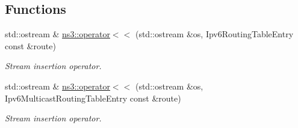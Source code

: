 \subsection*{Functions}
\begin{DoxyCompactItemize}
\item 
std\+::ostream \& \hyperlink{namespacens3_a05b3b1fa4697bd3d0e38436243095888}{ns3\+::operator$<$$<$} (std\+::ostream \&os, Ipv6\+Routing\+Table\+Entry const \&route)
\begin{DoxyCompactList}\small\item\em Stream insertion operator. \end{DoxyCompactList}\item 
std\+::ostream \& \hyperlink{namespacens3_a30841a81c3cf6b93f8f5d6358ef4b6a5}{ns3\+::operator$<$$<$} (std\+::ostream \&os, Ipv6\+Multicast\+Routing\+Table\+Entry const \&route)
\begin{DoxyCompactList}\small\item\em Stream insertion operator. \end{DoxyCompactList}\end{DoxyCompactItemize}
